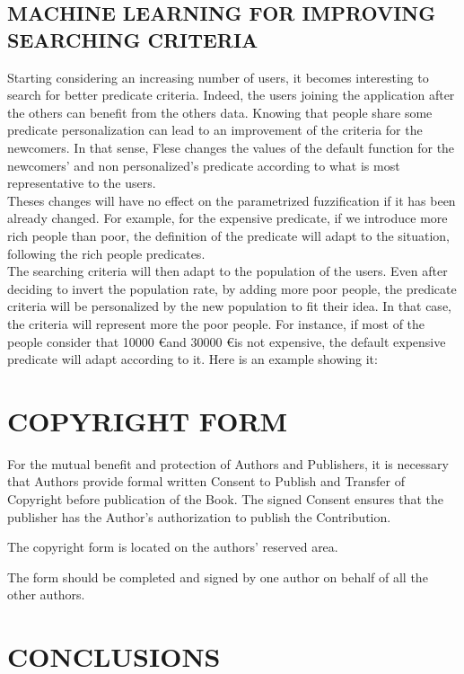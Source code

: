 \documentclass[a4paper,twoside]{article}
\begin{document}
\subsection{MACHINE LEARNING FOR IMPROVING SEARCHING CRITERIA}

\noindent Starting considering an increasing number of users, it becomes interesting to search for better predicate criteria. Indeed, the users joining the application after the others can benefit from the others data. Knowing that people share some predicate personalization can lead to an improvement of the criteria for the newcomers. In that sense, Flese changes the values of the default function for the newcomers' and non personalized's predicate according to what is most representative to the users. \\

\noindent Theses changes will have no effect on the parametrized fuzzification if it has been already changed. For example, for the expensive predicate, if we introduce more rich people than poor, the definition of the predicate will adapt to the situation, following the rich people predicates. \\

\noindent The searching criteria will then adapt to the population of the users. Even after deciding to invert the population rate, by adding more poor people, the predicate criteria will be personalized by the new population to fit their idea. In that case, the criteria will represent more the poor people.
For instance, if most of the people consider that 10000 \euro and 30000 \euro is not expensive, the default expensive predicate will adapt according to it. Here is an example showing it:


\section{\uppercase{Copyright Form}}

\noindent For the mutual benefit and protection of Authors and
Publishers, it is necessary that Authors provide formal written
Consent to Publish and Transfer of Copyright before publication of
the Book. The signed Consent ensures that the publisher has the
Author's authorization to publish the Contribution.

The copyright form is located on the authors' reserved area.

The form should be completed and signed by one author on
behalf of all the other authors.

\section{\uppercase{Conclusions}}
\label{sec:conclusion}
\end{document}

